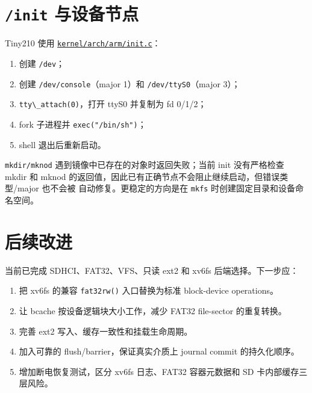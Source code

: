 \section{\texorpdfstring{\texttt{/init}
与设备节点}{/init 与设备节点}}\label{init-ux4e0eux8bbeux5907ux8282ux70b9}

Tiny210 使用
\href{../../../kernel/arch/arm/init.c}{\passthrough{\lstinline!kernel/arch/arm/init.c!}}：

\begin{enumerate}
\def\labelenumi{\arabic{enumi}.}
\tightlist
\item
  创建 \passthrough{\lstinline!/dev!}；
\item
  创建 \passthrough{\lstinline!/dev/console!}（major 1）和
  \passthrough{\lstinline!/dev/ttyS0!}（major 3）；
\item
  \passthrough{\lstinline!tty\_attach(0)!}，打开 ttyS0 并复制为 fd
  0/1/2；
\item
  fork 子进程并 \passthrough{\lstinline!exec("/bin/sh")!}；
\item
  shell 退出后重新启动。
\end{enumerate}

\passthrough{\lstinline!mkdir/mknod!}
遇到镜像中已存在的对象时返回失败；当前 init 没有严格检查 mkdir 和 mknod
的返回值，因此已有正确节点不会阻止继续启动，但错误类型/major 也不会被
自动修复。更稳定的方向是在 \passthrough{\lstinline!mkfs!}
时创建固定目录和设备命名空间。

\section{后续改进}\label{ux540eux7eedux6539ux8fdb}

当前已完成 SDHCI、FAT32、VFS、只读 ext2 和 xv6fs 后端选择。下一步应：

\begin{enumerate}
\def\labelenumi{\arabic{enumi}.}
\tightlist
\item
  把 xv6fs 的兼容 \passthrough{\lstinline!fat32rw()!} 入口替换为标准
  block-device operations。
\item
  让 bcache 按设备逻辑块大小工作，减少 FAT32 file-sector 的重复转换。
\item
  完善 ext2 写入、缓存一致性和挂载生命周期。
\item
  加入可靠的 flush/barrier，保证真实介质上 journal commit 的持久化顺序。
\item
  增加断电恢复测试，区分 xv6fs 日志、FAT32 容器元数据和 SD
  卡内部缓存三层风险。
\end{enumerate}
